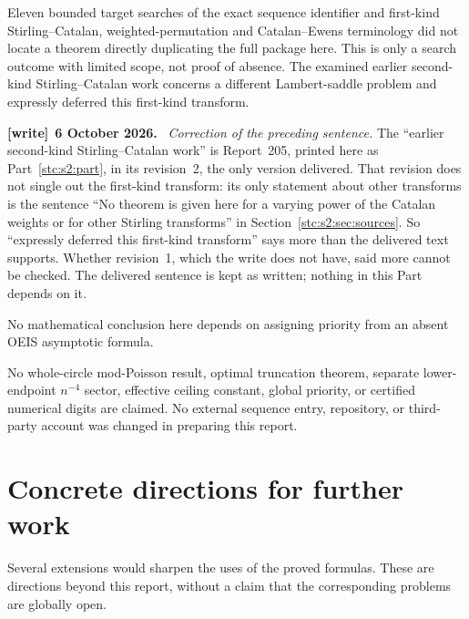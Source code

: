 \documentclass[11pt,letterpaper]{article}
\numberwithin{equation}{section}
\theoremstyle{remark}\newtheorem{remark}[theorem]{Remark}
\newenvironment{writenote}[1][]{\par\smallskip\begingroup\small
 \noindent\textbf{[write]}\if\relax\detokenize{#1}\relax\else~\textbf{#1.}\fi\ }%
 {\par\endgroup\smallskip}
\begin{document}
Eleven bounded target searches of the exact sequence identifier and first-kind Stirling--Catalan, weighted-permutation and Catalan--Ewens terminology did not locate a theorem directly duplicating the full package here. This is only a search outcome with limited scope, not proof of absence. The examined earlier second-kind Stirling--Catalan work concerns a different Lambert-saddle problem and expressly deferred this first-kind transform.
\begin{writenote}[6 October 2026]
\emph{Correction of the preceding sentence.} The ``earlier second-kind Stirling--Catalan work'' is Report~205, printed here as Part~\ref{stc:s2:part}, in its revision~2, the only version delivered. That revision does not single out the first-kind transform: its only statement about other transforms is the sentence ``No theorem is given here for a varying power of the Catalan weights or for other Stirling transforms'' in Section~\ref{stc:s2:sec:sources}. So ``expressly deferred this first-kind transform'' says more than the delivered text supports. Whether revision~1, which the write does not have, said more cannot be checked. The delivered sentence is kept as written; nothing in this Part depends on it.
\end{writenote}

 No mathematical conclusion here depends on assigning priority from an absent OEIS asymptotic formula.

No whole-circle mod-Poisson result, optimal truncation theorem, separate lower-endpoint $n^{-4}$ sector, effective ceiling constant, global priority, or certified numerical digits are claimed. No external sequence entry, repository, or third-party account was changed in preparing this report.

\section{Concrete directions for further work}\label{stc:s1:sec:further}
Several extensions would sharpen the uses of the proved formulas. These are directions beyond this report, without a claim that the corresponding problems are globally open.
\end{document}
